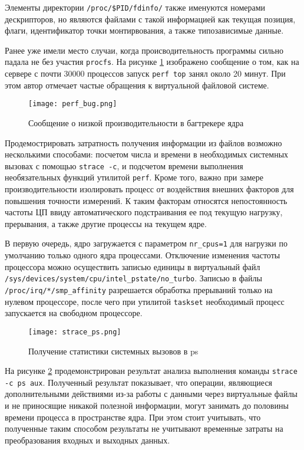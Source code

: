Элементы директории \texttt{/proc/\$PID/fdinfo/} также именуются номерами
дескрипторов, но являются файлами с такой информацией как текущая позиция,
флаги, идентификатор точки монтирвования, а также типозависимые данные.

Ранее уже имели место случаи, когда происводительность программы сильно падала
не без участия \texttt{procfs}\cite{slowperf}. На рисунке \ref{fig:perf_bug}
изображено сообщение о том, как на сервере с почти 30000 процессов запуск
\texttt{perf top} занял около 20 минут. При этом автор отмечает частые обращения
к виртуальной файловой системе.

\begin{figure}
  \centering
  \texttt{[image: perf\_bug.png]}
  \caption{Сообщение о низкой производительности в багтрекере ядра \cite{slowperf}}
  \label{fig:perf_bug}
\end{figure}

Продемострировать затратность получения информации из файлов возможно несколькими
способами: посчетом числа и времени в необходимых системных вызовах с помощью
\texttt{strace -c}, и подсчетом времени выполнения необязательных функций
утилитой \texttt{perf}. Кроме того, важно при замере производительности
изолировать процесс от воздействия внешних факторов для повышения точности
измерений. К таким факторам относятся непостоянность частоты ЦП ввиду
автоматического подстраивания ее под текущую нагрузку, прерывания, а также
другие процессы на текущем ядре\cite{kernelnewbies}.

В первую очередь, ядро загружается с параметром \texttt{nr\_cpus=1} для нагрузки
по умолчанию только одного ядра процессами\cite{kernel_docs}.
Отключение изменения частоты процессора можно осуществить записью единицы в
виртуальный файл
\texttt{/sys/devices/system/cpu/intel\_pstate/no\_turbo}. Записью в файлы
\texttt{/proc/irq/*/smp\_affinity} разрешается обработка прерываний только на
нулевом процессоре, после чего при утилитой \texttt{taskset} необходимый
процесс запускается на свободном процессоре.

\begin{figure}
  \centering
  \texttt{[image: strace\_ps.png]}
  \caption{Получение статистики системных вызовов в ps}
  \label{fig:strace_ps}
\end{figure}

На рисунке \ref{fig:strace_ps}
продемонстрирован результат анализа выполнения команды
\texttt{strace -c ps aux}. Полученный результат
показывает, что операции, являющиеся дополнительными действиями из-за работы с
данными через виртуальные файлы и не приносящие никакой полезной информации,
могут занимать до половины времени процесса в пространстве ядра. При этом стоит
учитывать, что полученные таким способом результаты не учитывают временные
затраты на преобразования входных и выходных данных. 

